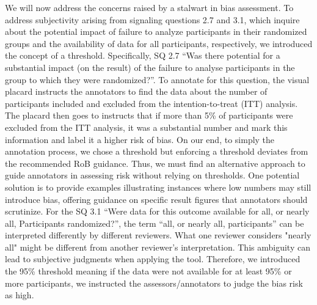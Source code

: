 \documentclass[sn-mathphys,Numbered]{sn-jnl}%
\theoremstyle{thmstyleone}%
\theoremstyle{thmstyletwo}%
\theoremstyle{thmstylethree}%
\begin{document}




We will now address the concerns raised by a stalwart in bias assessment.
To address subjectivity arising from signaling questions 2.7 and 3.1, which inquire about the potential impact of failure to analyze participants in their randomized groups and the availability of data for all participants, respectively, we introduced the concept of a threshold.
Specifically, SQ 2.7 ``Was there potential for a substantial impact (on the result) of the failure to analyse participants in the group to which they were randomized?''.
To annotate for this question, the visual placard instructs the annotators to find the data about the number of participants included and excluded from the intention-to-treat (ITT) analysis.
The placard then goes to instructs that if more than 5\% of participants were excluded from the ITT analysis, it was a substantial number and mark this information and label it a higher risk of bias.
On our end, to simply the annotation process, we chose a threshold but enforcing a threshold deviates from the recommended RoB guidance.
Thus, we must find an alternative approach to guide annotators in assessing risk without relying on thresholds.
One potential solution is to provide examples illustrating instances where low numbers may still introduce bias, offering guidance on specific result figures that annotators should scrutinize.
For the SQ 3.1 ``Were data for this outcome available for all, or nearly all, Participants randomized?'', the term ``all, or nearly all, participants'' can be interpreted differently by different reviewers.
What one reviewer considers "nearly all" might be different from another reviewer's interpretation.
This ambiguity can lead to subjective judgments when applying the tool.
Therefore, we introduced the 95\% threshold meaning if the data were not available for at least 95\% or more participants, we instructed the assessors/annotators to judge the bias risk as high.
\end{document}
